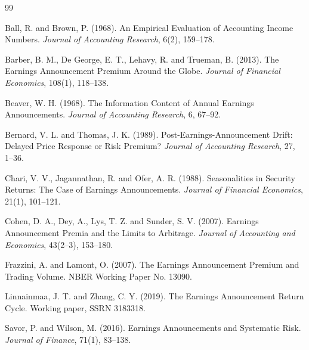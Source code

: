 \begin{thebibliography}{99}

Ball, R. and Brown, P. (1968). An Empirical Evaluation of Accounting Income
Numbers. \emph{Journal of Accounting Research}, 6(2), 159--178.

Barber, B. M., De George, E. T., Lehavy, R. and Trueman, B. (2013). The
Earnings Announcement Premium Around the Globe. \emph{Journal of Financial
Economics}, 108(1), 118--138.

Beaver, W. H. (1968). The Information Content of Annual Earnings Announcements.
\emph{Journal of Accounting Research}, 6, 67--92.

Bernard, V. L. and Thomas, J. K. (1989). Post-Earnings-Announcement Drift:
Delayed Price Response or Risk Premium? \emph{Journal of Accounting Research},
27, 1--36.

Chari, V. V., Jagannathan, R. and Ofer, A. R. (1988). Seasonalities in Security
Returns: The Case of Earnings Announcements. \emph{Journal of Financial
Economics}, 21(1), 101--121.

Cohen, D. A., Dey, A., Lys, T. Z. and Sunder, S. V. (2007). Earnings
Announcement Premia and the Limits to Arbitrage. \emph{Journal of Accounting
and Economics}, 43(2--3), 153--180.

Frazzini, A. and Lamont, O. (2007). The Earnings Announcement Premium and
Trading Volume. NBER Working Paper No. 13090.

Linnainmaa, J. T. and Zhang, C. Y. (2019). The Earnings Announcement Return
Cycle. Working paper, SSRN 3183318.

Savor, P. and Wilson, M. (2016). Earnings Announcements and Systematic Risk.
\emph{Journal of Finance}, 71(1), 83--138.

\end{thebibliography}



